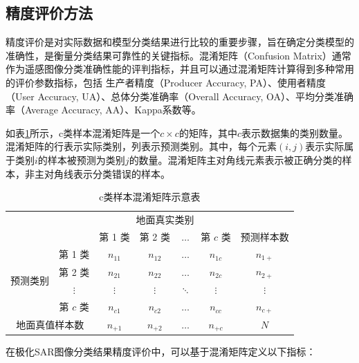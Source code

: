 \subsection{精度评价方法}
精度评价是对实际数据和模型分类结果进行比较的重要步骤，旨在确定分类模型的准确性，是衡量分类结果可靠性的关键指标。混淆矩阵（Confusion Matrix）通常作为遥感图像分类准确性能的评判指标，并且可以通过混淆矩阵计算得到多种常用的评价参数指标，包括
生产者精度（Producer Accuracy, PA）、使用者精度（User Accuracy, UA）、总体分类准确率（Overall Accuracy, OA）、平均分类准确率（Average Accuracy, AA）、Kappa系数等。

如表\ref{tab:conf_示意表}所示，c类样本混淆矩阵是一个$c \times c$的矩阵，其中$c$表示数据集的类别数量。混淆矩阵的行表示实际类别，列表示预测类别。其中，每个元素$(i, j)$表示实际属于类别$i$的样本被预测为类别$j$的数量。混淆矩阵主对角线元素表示被正确分类的样本，非主对角线表示分类错误的样本。

\begin{table}[ht!]
    \caption{c类样本混淆矩阵示意表}
    \label{tab:conf_示意表}
    \centering
    \begin{tabular}{ccccccc}
        \hline
                                    &          & \multicolumn{4}{c}{地面真实类别} &                                           \\
        \cline{3-6}
                                    &          & 第 1 类                      & 第 2 类    & $\ldots$ & 第 $c$ 类  & 预测样本数    \\
        \multirow{4}{*}{预测类别}       & 第 1 类    & $n_{11}$                   & $n_{12}$ & $\ldots$ & $n_{1c}$ & $n_{1+}$ \\
                                    & 第 2 类    & $n_{21}$                   & $n_{22}$ & $\ldots$ & $n_{2c}$ & $n_{2+}$ \\
                                    & $\vdots$ & $\vdots$                   & $\vdots$ & $\ddots$ & $\vdots$ & $\vdots$ \\
                                    & 第 $c$ 类  & $n_{c1}$                   & $n_{c2}$ & $\ldots$ & $n_{cc}$ & $n_{c+}$ \\
        \multicolumn{2}{c}{地面真值样本数} & $n_{+1}$ & $n_{+2}$                   & $\ldots$ & $n_{+c}$ & $N$                 \\
        \hline
    \end{tabular}
\end{table}

在极化SAR图像分类结果精度评价中，可以基于混淆矩阵定义以下指标：

